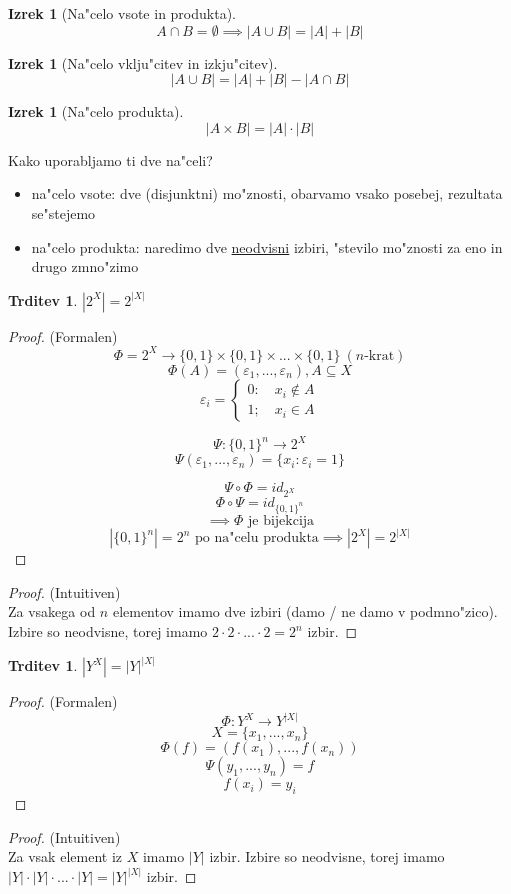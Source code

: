 \documentclass[a4paper,12pt]{article}
\theoremstyle{definition}
\newtheorem{claim}[counter]{Trditev}
\newtheorem{theorem}[counter]{Izrek}
\theoremstyle{remark}
\begin{document}
\begin{theorem}[Na"celo vsote in produkta]
	\[
	A \cap B = \emptyset \implies |A \cup B| = |A| + |B|
	\]
\end{theorem}

\begin{theorem}[Na"celo vklju"citev in izkju"citev]
	\[
	|A \cup B| = |A| + |B| - |A \cap B|
	\]
\end{theorem}


\begin{theorem}[Na"celo produkta]
	\[
	|A\times B| = |A|\cdot|B|
	\]
\end{theorem}

Kako uporabljamo ti dve na"celi?
\begin{itemize}
	\item na"celo vsote: dve (disjunktni) mo"znosti, obarvamo vsako posebej, rezultata se"stejemo
	\item na"celo produkta: naredimo dve \underline{neodvisni} izbiri, "stevilo mo"znosti za eno in drugo zmno"zimo
\end{itemize}

\begin{claim}
	$|2^X| = 2^{|X|}$
\end{claim}


\begin{proof}
	(Formalen)
	\[\Phi = 2^X \rightarrow \{0, 1\}\times\{0, 1\}\times...\times\{0, 1\} \ (n\text{-krat})\]
	\[\Phi(A) = (\varepsilon_1, ..., \varepsilon_n), A \subseteq X\]
	\[\varepsilon_i = \begin{cases}0: \quad x_i \notin A  \\ 1; \quad x_i \in A \end{cases}\]


	\[
	\Psi : \{0, 1\}^n \rightarrow 2^X
	\]
	\[
	\Psi (\varepsilon_1, ..., \varepsilon_n) = \{x_i : \varepsilon_i = 1\}
	\]


	\[\Psi \circ \Phi = id_{2^X}\]
	\[\Phi \circ \Psi = id_{\{0, 1\}^n}\]
	\[\implies \Phi \text{ je bijekcija}\]
	\[|\{0, 1\}^n| = 2^n \text{ po na"celu produkta}\implies |2^X| = 2^{|X|}\]
\end{proof}
\begin{proof}
	(Intuitiven)\\
	Za vsakega od $n$ elementov imamo dve izbiri (damo / ne damo v podmno"zico).
	Izbire so neodvisne, torej imamo
	$2 \cdot 2 \cdot ...\cdot 2 = 2^n$
	izbir.
\end{proof}

\begin{claim}
	$|Y^X| = |Y|^{|X|}$
\end{claim}
\begin{proof}(Formalen)
	\[\Phi : Y^X \rightarrow Y^{|X|}\]
	\[X = \{x_1, ..., x_n\}\]
	\[\Phi (f) = (f(x_1), ..., f(x_n))\]
	\[\Psi (y_1, ..., y_n) = f\]
	\[f(x_i) = y_i\]
\end{proof}
\begin{proof}(Intuitiven)\\
	Za vsak element iz $X$ imamo $|Y|$ izbir. Izbire so neodvisne, torej imamo $|Y|\cdot|Y|\cdot ... \cdot|Y| = |Y|^{|X|}$ izbir.
\end{proof}
\end{document}
